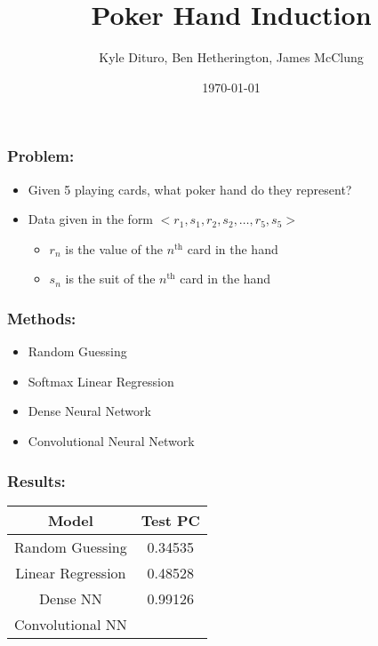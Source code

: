 \documentclass{beamer}
\title{Poker Hand Induction}
\author{Kyle Dituro, Ben Hetherington, James McClung}
\date{\today}
\begin{document}
    
    \begin{frame}
        \titlepage
    \end{frame}

    \begin{frame}[c]\frametitle{Problem:}
        \begin{itemize}
            \item Given 5 playing cards, what poker hand do they represent?
            \item Data given in the form $<r_1, s_1, r_2, s_2, \dots, r_5, s_5>$
            \begin{itemize}
                \item $r_n$ is the value of the $n^{\text{th}}$ card in the hand
                \item $s_n$ is the suit of the $n^{\text{th}}$ card in the hand
            \end{itemize}
        \end{itemize}
    \end{frame}

    \begin{frame}[c]\frametitle{Methods:}  
            \begin{itemize}
                \item Random Guessing
                \item Softmax Linear Regression
                \item Dense Neural Network
                \item Convolutional Neural Network
            \end{itemize}
    \end{frame}

    \begin{frame}[c]\frametitle{Results:}
        \begin{center}
            \begin{tabular}{|c|c|}
                \hline
                Model & Test PC 
                \\\hline
                Random Guessing & 0.34535 \\
                Linear Regression & 0.48528 \\
                Dense NN & 0.99126 \\
                Convolutional NN & \\
                \hline 
            \end{tabular}
        \end{center}
    \end{frame}
\end{document}
